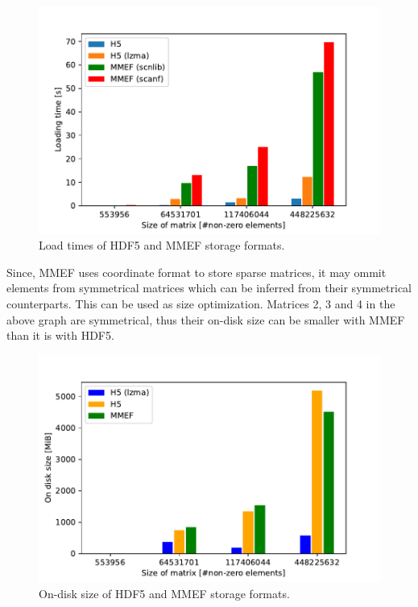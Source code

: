\documentclass[thesis=M,english]{FITthesis}[2019/12/23]
\begin{document}
\begin{figure}[!h]
    \centering
    \includegraphics[scale=0.5]{static/mmef_vs_h5.pdf}
    \caption{Load times of HDF5 and MMEF storage formats.}
\end{figure}


Since, MMEF uses coordinate format to store sparse matrices, it may ommit elements from symmetrical matrices which can be inferred
from their symmetrical counterparts. This can be used as size optimization. Matrices 2, 3 and 4 in the above graph are symmetrical,
thus their on-disk size can be smaller with MMEF than it is with HDF5.

\begin{figure}[!h]
    \centering
    \includegraphics[scale=0.5]{static/mmef_vs_h5_stor.pdf}
    \caption{On-disk size of HDF5 and MMEF storage formats.}
\end{figure}
\end{document}
